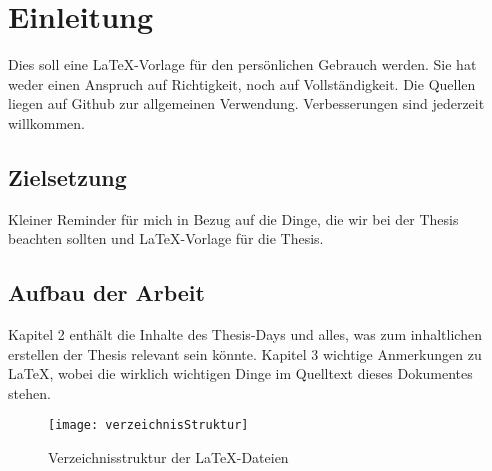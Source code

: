\section{Einleitung}
Dies soll eine \LaTeX{}-Vorlage für den persönlichen Gebrauch werden. Sie hat weder einen Anspruch auf Richtigkeit, noch auf Vollständigkeit. Die Quellen liegen auf Github zur allgemeinen Verwendung. Verbesserungen sind jederzeit willkommen. 

\subsection{Zielsetzung}
Kleiner Reminder für mich in Bezug auf die Dinge, die wir bei der Thesis beachten sollten und \LaTeX{}-Vorlage für die Thesis.

\subsection{Aufbau der Arbeit}
Kapitel 2 enthält die Inhalte des Thesis-Days und alles, was zum inhaltlichen erstellen der Thesis relevant sein könnte. Kapitel 3 wichtige Anmerkungen zu \LaTeX{}, wobei die wirklich wichtigen Dinge im Quelltext dieses Dokumentes stehen. 

\begin{figure}[H]
\begin{center}
\texttt{[image: verzeichnisStruktur]}
\caption{Verzeichnisstruktur der \LaTeX{}-Dateien}
\end{center}
\end{figure}
